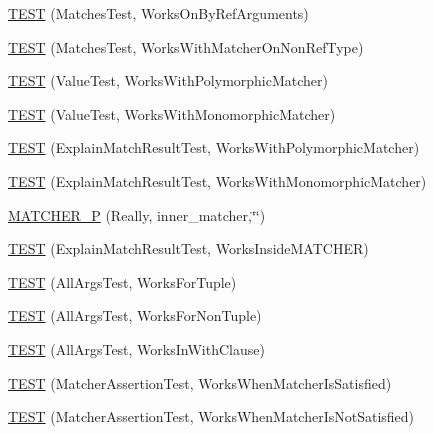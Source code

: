 \begin{DoxyCompactItemize}
\hyperlink{namespacetesting_1_1gmock__matchers__test_a6cfa391c9035262ccdc0d8f59e037b4d}{T\+E\+ST} (Matches\+Test, Works\+On\+By\+Ref\+Arguments)
\item 
\hyperlink{namespacetesting_1_1gmock__matchers__test_a9fd734ae5afb64a7285503bc0870c255}{T\+E\+ST} (Matches\+Test, Works\+With\+Matcher\+On\+Non\+Ref\+Type)
\item 
\hyperlink{namespacetesting_1_1gmock__matchers__test_a150118d4e990ba9fb9978329e742c931}{T\+E\+ST} (Value\+Test, Works\+With\+Polymorphic\+Matcher)
\item 
\hyperlink{namespacetesting_1_1gmock__matchers__test_a53403682e9ffc12152b0b1c7f55dfa12}{T\+E\+ST} (Value\+Test, Works\+With\+Monomorphic\+Matcher)
\item 
\hyperlink{namespacetesting_1_1gmock__matchers__test_a985e2bc1546b67de764d759de111e8e9}{T\+E\+ST} (Explain\+Match\+Result\+Test, Works\+With\+Polymorphic\+Matcher)
\item 
\hyperlink{namespacetesting_1_1gmock__matchers__test_aeff2711a03b27a66c1c98ed97ff49b09}{T\+E\+ST} (Explain\+Match\+Result\+Test, Works\+With\+Monomorphic\+Matcher)
\item 
\hyperlink{namespacetesting_1_1gmock__matchers__test_ae59dd69f7bc69e592dc851fef825d0ba}{M\+A\+T\+C\+H\+E\+R\+\_\+P} (Really, inner\+\_\+matcher,\char`\"{}\char`\"{})
\item 
\hyperlink{namespacetesting_1_1gmock__matchers__test_ae57edef8890da6b929dd0d21c2f7c071}{T\+E\+ST} (Explain\+Match\+Result\+Test, Works\+Inside\+M\+A\+T\+C\+H\+ER)
\item 
\hyperlink{namespacetesting_1_1gmock__matchers__test_aeea300647af4c7611f4e491cabcbf950}{T\+E\+ST} (All\+Args\+Test, Works\+For\+Tuple)
\item 
\hyperlink{namespacetesting_1_1gmock__matchers__test_aacc3ed6d6a0f9ff552019d0d58817b6f}{T\+E\+ST} (All\+Args\+Test, Works\+For\+Non\+Tuple)
\item 
\hyperlink{namespacetesting_1_1gmock__matchers__test_ad62534535946b2ef45457fb653f73a98}{T\+E\+ST} (All\+Args\+Test, Works\+In\+With\+Clause)
\item 
\hyperlink{namespacetesting_1_1gmock__matchers__test_ad37559f9112c04334a62ce9617cf1349}{T\+E\+ST} (Matcher\+Assertion\+Test, Works\+When\+Matcher\+Is\+Satisfied)
\item 
\hyperlink{namespacetesting_1_1gmock__matchers__test_a2f3755be7052d6e7769e3323053399d0}{T\+E\+ST} (Matcher\+Assertion\+Test, Works\+When\+Matcher\+Is\+Not\+Satisfied)
\item 

\end{DoxyCompactItemize}
